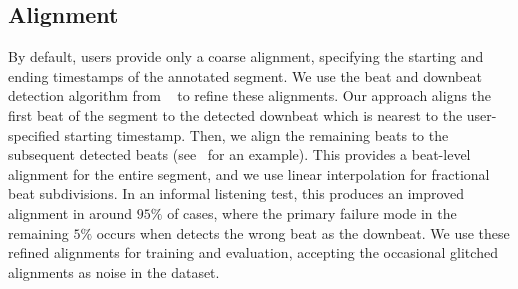 \subsection{Alignment}

By default, \hooktheory{} users provide only a coarse alignment, specifying the starting and ending timestamps of the annotated segment. 
We use the beat and downbeat detection algorithm from \madmom{}~\cite{bock2016joint,bock2016madmom} to refine these alignments. 
Our approach aligns the first beat of the segment to the detected downbeat which is nearest to the user-specified starting timestamp. 
Then, we align the remaining beats to the subsequent detected beats (see~ for an example). 
This provides a beat-level alignment for the entire segment, and we use linear interpolation for fractional beat subdivisions. 
In an informal listening test, this produces an improved alignment in around $95\%$ of cases, where the primary failure mode in the remaining $5\%$ occurs when \madmom{} detects the wrong beat as the downbeat. 
We use these refined alignments for training and evaluation, accepting the occasional glitched alignments as noise in the dataset.